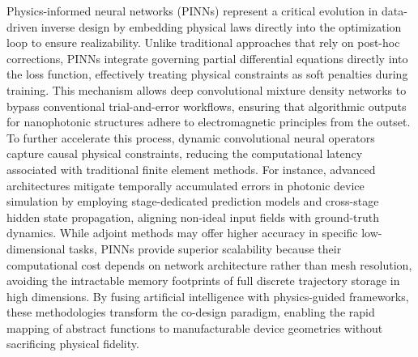 Physics-informed neural networks (PINNs) represent a critical evolution in data-driven inverse design by embedding physical laws directly into the optimization loop to ensure realizability. Unlike traditional approaches that rely on post-hoc corrections, PINNs integrate governing partial differential equations directly into the loss function, effectively treating physical constraints as soft penalties during training. \citep{doi_10_1007_s10444_023_10065_9_12bf0652} \citep{s2_cc39d5405a933620426d86298fa8fe4cd51915c5_27626ee3} This mechanism allows deep convolutional mixture density networks to bypass conventional trial-and-error workflows, ensuring that algorithmic outputs for nanophotonic structures adhere to electromagnetic principles from the outset. To further accelerate this process, dynamic convolutional neural operators capture causal physical constraints, reducing the computational latency associated with traditional finite element methods. For instance, advanced architectures mitigate temporally accumulated errors in photonic device simulation by employing stage-dedicated prediction models and cross-stage hidden state propagation, aligning non-ideal input fields with ground-truth dynamics. While adjoint methods may offer higher accuracy in specific low-dimensional tasks, PINNs provide superior scalability because their computational cost depends on network architecture rather than mesh resolution, avoiding the intractable memory footprints of full discrete trajectory storage in high dimensions. By fusing artificial intelligence with physics-guided frameworks, these methodologies transform the co-design paradigm, enabling the rapid mapping of abstract functions to manufacturable device geometries without sacrificing physical fidelity. \citep{doi_10_48550_arxiv_2406_17810_813bd2a3} \citep{s2_037e66f37189104d61c0d000de0cee202b7eec9e_d15b8018} \citep{doi_10_48550_arxiv_2606_12337_68b62bfa}

